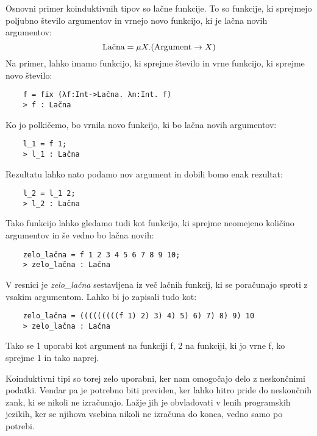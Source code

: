\documentclass[a4paper]{report}
\begin{document}
Osnovni primer koinduktivnih tipov so lačne funkcije. To so funkcije, ki sprejmejo poljubno število argumentov in vrnejo novo funkcijo, ki je lačna novih argumentov:
\begin{equation}
    \text{Lačna} = \mu X. (\text{Argument} \rightarrow X) \notag
\end{equation}
Na primer, lahko imamo funkcijo, ki sprejme število in vrne funkcijo, ki sprejme novo število:
\begin{lstlisting}
    f = fix (λf:Int->Lačna. λn:Int. f)
    > f : Lačna
\end{lstlisting}
Ko jo polkičemo, bo vrnila novo funkcijo, ki bo lačna novih argumentov:
\begin{lstlisting}
    l_1 = f 1;
    > l_1 : Lačna
\end{lstlisting}
Rezultatu lahko nato podamo nov argument in dobili bomo enak rezultat:
\begin{lstlisting}
    l_2 = l_1 2;
    > l_2 : Lačna  
\end{lstlisting}
Tako funkcijo lahko gledamo tudi kot funkcijo, ki sprejme neomejeno količino argumentov in še vedno bo lačna novih:
\begin{lstlisting}
    zelo_lačna = f 1 2 3 4 5 6 7 8 9 10;
    > zelo_lačna : Lačna
\end{lstlisting}
V resnici je \emph{zelo\_lačna} sestavljena iz več lačnih funkcij, ki se poračunajo sproti z vsakim argumentom. Lahko bi jo zapisali tudo kot:
\begin{lstlisting}
    zelo_lačna = (((((((((f 1) 2) 3) 4) 5) 6) 7) 8) 9) 10
    > zelo_lačna : Lačna
\end{lstlisting}
Tako se 1 uporabi kot argument na funkciji f, 2 na funkciji, ki jo vrne f, ko sprejme 1 in tako naprej.

Koinduktivni tipi so torej zelo uporabni, ker nam omogočajo delo z neskončnimi podatki. Vendar pa je potrebno biti previden, ker lahko hitro pride do neskončnih zank, ki se nikoli ne izračunajo. 
Lažje jih je obvladovati v lenih programskih jezikih, ker se njihova vsebina nikoli ne izračuna do konca, vedno samo po potrebi.
\end{document}
